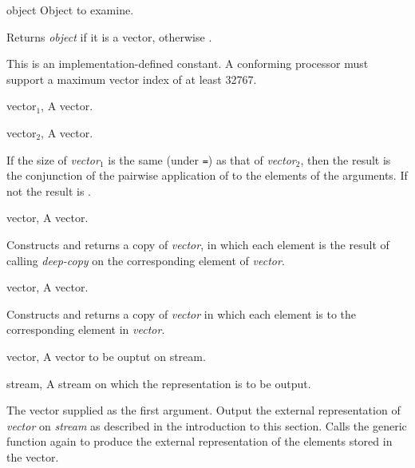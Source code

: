 \begin{optDefinition}
%
\begin{arguments}
    \item[object] Object to examine.
\end{arguments}
%
\result%
Returns {\em object\/} if it is a vector, otherwise \nil{}.

%
\remarks%
This is an implementation-defined constant.  A conforming processor must support
a maximum vector index of at least
32767.

%
\begin{specargs}
    \item[vector$_1$, \classref{vector}] A vector.
    \item[vector$_2$, \classref{vector}] A vector.
\end{specargs}
%
\result%
If the size of {\em vector$_1$} is the same (under {\tt =}) as that of {\em
    vector$_2$}, then the result is the conjunction of the pairwise application
of  to the elements of the arguments.  If not the result is
\nil{}.

%
\begin{specargs}
    \item[vector, \classref{vector}] A vector.
\end{specargs}
%
\result%
Constructs and returns a copy of {\em vector}, in which each element is the
result of calling {\em deep-copy\/} on the corresponding element of {\em
    vector}.

%
\begin{specargs}
    \item[vector, \classref{vector}] A vector.
\end{specargs}
%
\result%
Constructs and returns a copy of {\em vector\/} in which each element is
 to the corresponding element in {\em vector}.

%
\begin{specargs}
    \item[vector, \classref{vector}]
    A vector to be ouptut on stream.
    \item[stream, \classref{stream}]
    A stream on which the representation is to be output.
\end{specargs}
%
\result%
The vector supplied as the first argument.
%
\remarks%
Output the external representation of {\em vector\/} on {\em stream\/} as
described in the introduction to this section.  Calls the generic function again
to produce the external representation of the elements stored in the vector.


\end{optDefinition}
